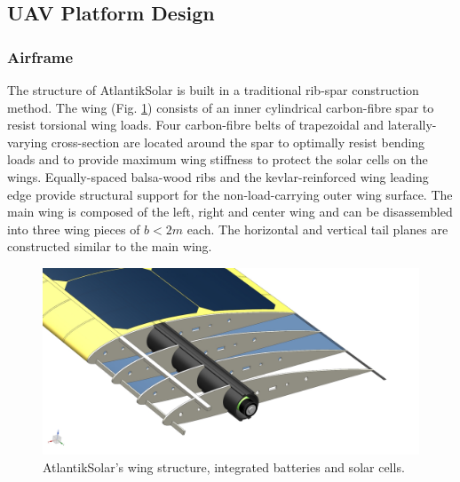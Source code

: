 \subsection{UAV Platform Design}

\subsubsection{Airframe}\label{secsec:Airframe and hardware}
The structure of AtlantikSolar is built in a traditional rib-spar construction method. The wing (Fig. \ref{fig:CAD_AtlantikSolarStructure}) consists of an inner cylindrical carbon-fibre spar to resist torsional wing loads. Four carbon-fibre belts of trapezoidal and laterally-varying cross-section are located around the spar to optimally resist bending loads and to provide maximum wing stiffness to protect the solar cells on the wings. Equally-spaced balsa-wood ribs and the kevlar-reinforced wing leading edge provide structural support for the non-load-carrying outer wing surface. The main wing is composed of the left, right and center wing and can be disassembled into three wing pieces of $b<2m$ each. The horizontal and vertical tail planes are constructed similar to the main wing.

\begin{figure}[tb]
    \centering
    \includegraphics[width=\linewidth]{images/7_CAD_AtlantikSolarStructure}
    \caption{AtlantikSolar's wing structure, integrated batteries and solar cells.}
    \label{fig:CAD_AtlantikSolarStructure}
\end{figure}

